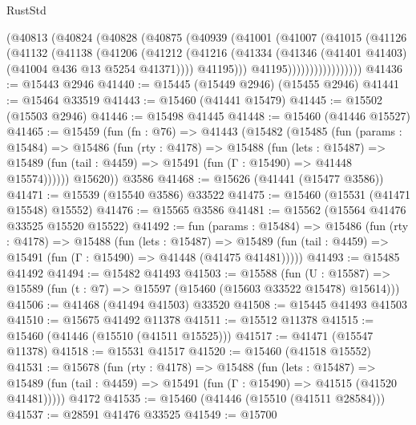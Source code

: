 \begin{lexlean}{RustStd}
\begin{coremodule}
                  (@40813
                    (@40824
                      (@40828
                        (@40875
                          (@40939
                            (@41001
                              (@41007
                                (@41015
                                  (@41126
                                    (@41132
                                      (@41138
                                        (@41206
                                          (@41212
                                            (@41216
                                              (@41334
                                                (@41346
                                                  (@41401 @41403)
                                                  (@41004 @436 @13 @5254 @41371))))
                                            @41195)))
                                      @41195)))))))))))))))))
@41436 := @15443 @2946
@41440 := @15445 (@15449 @2946) (@15455 @2946)
@41441 := @15464 @33519
@41443 := @15460 (@41441 @15479)
@41445 := @15502 (@15503 @2946)
@41446 := @15498 @41445
@41448 := @15460 (@41446 @15527)
@41465 := @15459
    (fun (fn : @76) =>
    @41443
      (@15482
        (@15485
          (fun (params : @15484) =>
          @15486
            (fun (rty : @4178) =>
            @15488
              (fun (lets : @15487) =>
              @15489 (fun (tail : @4459) => @15491 (fun (Γ : @15490) => @41448 @15574))))))
        @15620))
    @3586
@41468 := @15626 (@41441 (@15477 @3586))
@41471 := @15539 (@15540 @3586) @33522
@41475 := @15460 (@15531 (@41471 @15548) @15552)
@41476 := @15565 @3586
@41481 := @15562 (@15564 @41476 @33525 @15520 @15522)
@41492 := fun (params : @15484) =>
  @15486
    (fun (rty : @4178) =>
    @15488
      (fun (lets : @15487) =>
      @15489 (fun (tail : @4459) => @15491 (fun (Γ : @15490) => @41448 (@41475 @41481)))))
@41493 := @15485 @41492
@41494 := @15482 @41493
@41503 := @15588
    (fun (U : @15587) => @15589 (fun (t : @7) => @15597 (@15460 (@15603 @33522 @15478) @15614)))
@41506 := @41468 (@41494 @41503) @33520
@41508 := @15445 @41493 @41503
@41510 := @15675 @41492 @11378
@41511 := @15512 @11378
@41515 := @15460 (@41446 (@15510 (@41511 @15525)))
@41517 := @41471 (@15547 @11378)
@41518 := @15531 @41517
@41520 := @15460 (@41518 @15552)
@41531 := @15678
    (fun (rty : @4178) =>
    @15488
      (fun (lets : @15487) =>
      @15489 (fun (tail : @4459) => @15491 (fun (Γ : @15490) => @41515 (@41520 @41481)))))
    @4172
@41535 := @15460 (@41446 (@15510 (@41511 @28584)))
@41537 := @28591 @41476 @33525
@41549 := @15700

\end{coremodule}
\end{lexlean}
